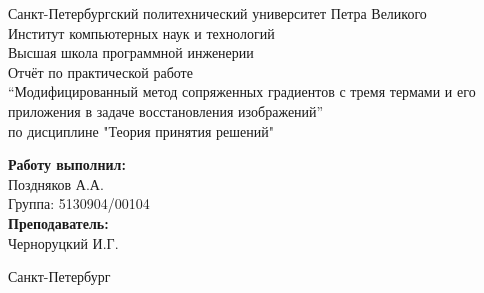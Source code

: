\begin{titlepage}	%

	\begin{center}		%

		\large Санкт-Петербургский политехнический университет Петра Великого\\
		\large Институт компьютерных наук и технологий \\
		\large Высшая школа программной инженерии\\[8cm]
		
		\huge Отчёт по практической работе\\[0.5cm] %
		\large ``Модифицированный метод сопряженных градиентов с тремя
		термами и его приложения в задаче восстановления изображений''\\[0.5cm]
		\large по дисциплине "Теория принятия решений"\\[3cm]

	\end{center}

	\begin{flushright} %
		\begin{minipage}{0.25\textwidth} %
			\begin{flushleft} %

				\large\textbf{Работу выполнил:}\\
				\large Поздняков А.А.\\
				\large {Группа:} 5130904/00104\\
				
				\large \textbf{Преподаватель:}\\
				\large Черноруцкий И.Г.

			\end{flushleft}
		\end{minipage}
	\end{flushright}
	
	\vfill %

	\begin{center}
	\large Санкт-Петербург\\
	\large \the\year %
	\end{center} %

\end{titlepage} %


